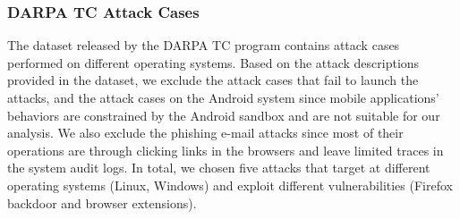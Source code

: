 \subsubsection{DARPA TC Attack Cases}
The dataset released by the DARPA TC program contains attack cases performed on different operating systems.
Based on the attack descriptions provided in the dataset, we exclude the attack cases that fail to launch the attacks, and the attack cases on the Android system since mobile applications' behaviors are constrained by the Android sandbox and are not suitable for our analysis.
We also exclude the phishing e-mail attacks since most of their operations are through clicking links in the browsers and leave limited traces in the system audit logs.
In total, we chosen five attacks that target at different operating systems (Linux, Windows) and exploit different vulnerabilities (Firefox backdoor and browser extensions). 


